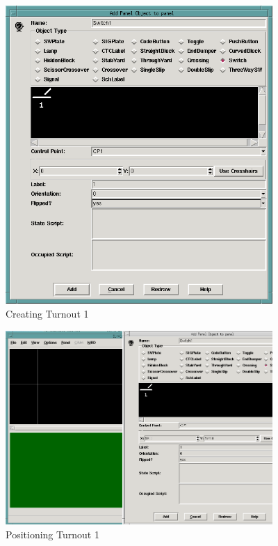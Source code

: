 \begin{figure}[hbpt] 
\begin{centering}
\includegraphics[width=4in]{DISPSimpleTutSw1.png} 
\caption{Creating Turnout 1}
\label{fig:dispatcher:Tut:Sw1} 
\end{centering} 
\end{figure}
%
\begin{figure}[hbpt] 
\begin{centering}
\includegraphics[width=4in]{DISPSimpleTutSw1CrossHairs.png} 
\caption{Positioning Turnout 1} 
\label{fig:dispatcher:Tut:Sw1CrossHairs} 
\end{centering}
\end{figure} 
%
